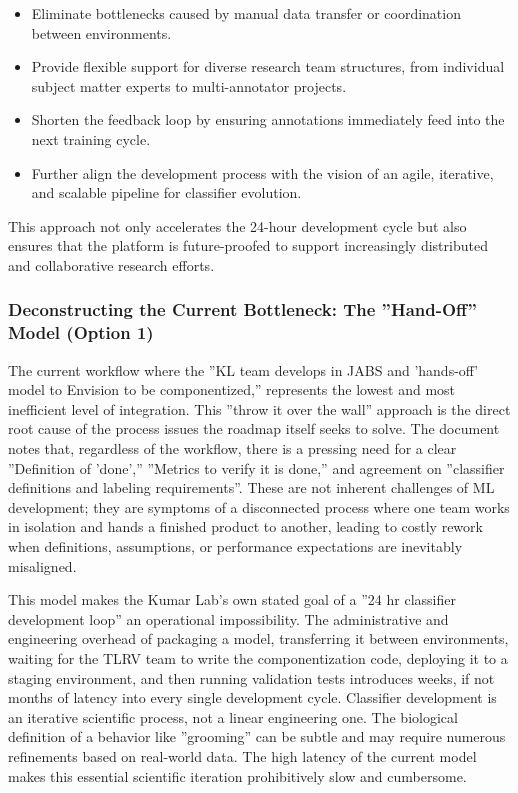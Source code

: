 \documentclass[11pt,a4paper]{article}
\begin{document}
\begin{itemize}
    \item Eliminate bottlenecks caused by manual data transfer or coordination between environments.
    \item Provide flexible support for diverse research team structures, from individual subject matter experts to multi-annotator projects.
    \item Shorten the feedback loop by ensuring annotations immediately feed into the next training cycle.
    \item Further align the development process with the vision of an agile, iterative, and scalable pipeline for classifier evolution.

\end{itemize}

This approach not only accelerates the 24-hour development cycle but also ensures that the platform is future-proofed to support increasingly distributed and collaborative research efforts.

\subsubsection{Deconstructing the Current Bottleneck: The ”Hand-Off” Model (Option 1)}

The current workflow where the ”KL team develops in JABS and ’hands-off’ model to Envision to be componentized,” represents the lowest and most inefficient level of integration. This ”throw it over the wall” approach is the direct root cause of the process issues the roadmap itself seeks to solve. The document notes that, regardless of the workflow, there is a pressing need for a clear ”Definition of ’done’,” ”Metrics to verify it is done,” and agreement on ”classifier definitions and labeling requirements”. These are not inherent challenges of ML development; they are symptoms of a disconnected process where one team works in isolation and hands a finished product to another, leading to costly rework when definitions, assumptions, or performance expectations are inevitably misaligned.

This model makes the Kumar Lab’s own stated goal of a ”24 hr classifier development loop” an operational impossibility. The administrative and engineering overhead of packaging a model, transferring it between environments, waiting for the TLRV team to write the componentization code, deploying it to a staging environment, and then running validation tests introduces weeks, if not months of latency into every single development cycle. Classifier development is an iterative scientific process, not a linear engineering one. The biological definition of a behavior like ”grooming” can be subtle and may require numerous refinements based on real-world data. The high latency of the current model makes this essential scientific iteration prohibitively slow and cumbersome.
\end{document}
